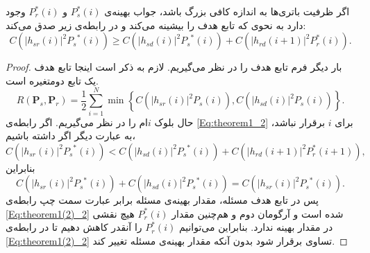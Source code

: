 \begin{theorem}
اگر ظرفیت باتری‌ها به اندازه کافی بزرگ باشد، جواب بهینه‌ی 
$P_s^*(i)$
و
$P_r^*(i)$
وجود دارد به نحوی که تابع هدف را بیشینه می‌کند و در رابطه‌ی زیر صدق می‌کند:
\begin{equation}
C\left( {{{\left| {{h_{sr}}\left( i \right)} \right|}^2}{P_s}^*\left( i \right)} \right) \ge C\left( {{{\left| {{h_{sd}}\left( i \right)} \right|}^2}{P_s}^*\left( i \right)} \right) + C\left( {{{\left| {{h_{rd}}\left( {i + 1} \right)} \right|}^2}P_r^*\left( {i} \right)} \right).
\label{Eq:theorem1_2}
\end{equation}

\begin{proof}
بار دیگر فرم تابع هدف را در نظر می‌گیریم. لازم به ذکر است اینجا تابع هدف یک تابع دومتغیره است.
\begin{equation}
{R({\mathbf{P}_s},{\mathbf{P}_r}) = {\frac{1}{2}\sum\limits_{i = 1}^N {\min } \left\{ {C\left( {{{\left| {{h_{sr}}\left( i \right)} \right|}^2}{P_s}\left( i \right)} \right),} C\left( {{{\left| {{h_{sd}}\left( i \right)} \right|}^2}{P_s}\left( i \right)} \right) \right\} }}.
\end{equation}
حال بلوک
$i$ام
را در نظر می‌گیریم. اگر رابطه‌ی
\ref{Eq:theorem1_2}
برای
$i$
برقرار نباشد، به عبارت دیگر اگر داشته باشیم،
\begin{equation}
C\left( {{{\left| {{h_{sr}}\left( i \right)} \right|}^2}{P_s}^*\left( i \right)} \right) < C\left( {{{\left| {{h_{sd}}\left( i \right)} \right|}^2}{P_s}^*\left( i \right)} \right) + C\left( {{{\left| {{h_{rd}}\left( {i + 1} \right)} \right|}^2}P_r^*\left( {i + 1} \right)} \right),
\label{Eq:theorem1(2)_2}
\end{equation}
بنابراین
\begin{equation}
C\left( {{{\left| {{h_{sr}}\left( i \right)} \right|}^2}{P_s}^*\left( i \right)} \right)+ C\left( {{{\left| {{h_{sd}}\left( i \right)} \right|}^2}{P_s}^*\left( i \right)} \right) =C\left( {{{\left| {{h_{sr}}\left( i \right)} \right|}^2}{P_s}^*\left( i \right)} \right).
\end{equation}
پس در تابع هدف مسئله، مقدار بهینه‌ی مسئله برابر عبارت سمت چپ رابطه‌ی
\ref{Eq:theorem1(2)_2}
شده است و آرگومان دوم و  هم‌چنین مقدار
$P_r^*(i)$
هیچ نقشی در مقدار بهینه ندارد. بنابراین می‌توانیم 
$P_r^*(i)$
را آنقدر کاهش دهیم تا در رابطه‌ی
\ref{Eq:theorem1(2)_2}
تساوی برقرار شود بدون آنکه مقدار بهینه‌ی مسئله تغییر کند.
\end{proof}
\label{theorem1_2}
\end{theorem}

